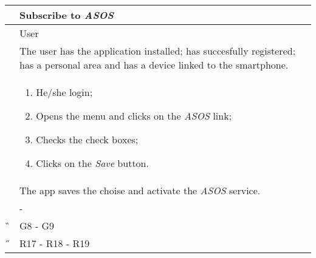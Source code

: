 \begin{center}
	\begin{longtable}{ | p{} | p{} | }
		\hline
		 \A &   Subscribe to \textit{ASOS}\\ 

		\hline
		 \B &  User \\ 

		\hline
  		 \C &  The user has the application installed; has succesfully registered; has a personal area and has a device linked to the smartphone.\\ 

		\hline
		\D & \begin{enumerate}
			\item He/she login;
			\item Opens the menu and clicks on the \textit{ASOS} link;
			\item Checks the check boxes;
			\item Clicks on the \textit{Save} button.
		\end{enumerate} \\

		\hline
		\E & The app saves the choise and activate the \textit{ASOS} service.\\

		\hline
		\F & - \\
		
		\hline
		\G & G8 - G9\\

		\hline
		\H & R17 - R18 - R19 \\
		\hline

	\end{longtable}
\end{center}